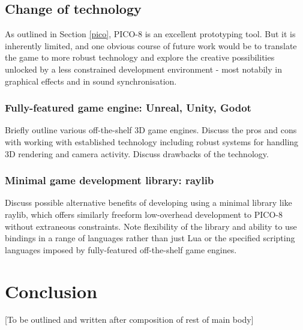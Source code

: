 \documentclass{article}
\begin{document}
\subsection{Change of technology}

As outlined in Section \ref{pico}, PICO-8 is an excellent prototyping tool. But it is inherently
limited, and one obvious course of future work would be to translate the game to more robust technology
and explore the creative possibilities unlocked by a less constrained development environment - most
notabily in graphical effects and in sound synchronisation.

\subsubsection*{Fully-featured game engine: Unreal, Unity, Godot}
Briefly outline various off-the-shelf 3D game engines. Discuss the pros and cons with working with
established technology including robust systems for handling 3D rendering and camera activity. Discuss
drawbacks of the technology. 

\subsubsection*{Minimal game development library: raylib}
Discuss possible alternative benefits of developing using a minimal library like raylib,
which offers similarly freeform low-overhead development to PICO-8 without extraneous
constraints. Note flexibility of the library and ability to use bindings in a range of
languages rather than just Lua or the specified scripting languages imposed by fully-featured
off-the-shelf game engines.


\section{Conclusion}
[To be outlined and written after composition of rest of main body]

\printbibliography
\end{document}
